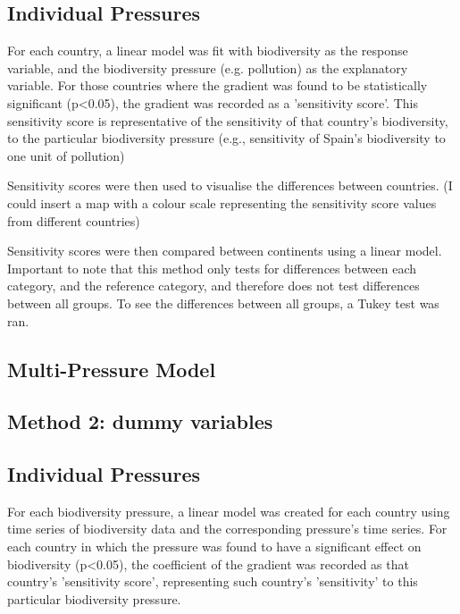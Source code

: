 \documentclass[11pt, a4paper, titlepage]{article}
\begin{document}
	\subsection*{Individual Pressures}
	
	For each country, a linear model was fit with biodiversity as the response variable, and the biodiversity pressure (e.g. pollution) as the explanatory variable. For those countries where the gradient was found to be statistically significant (p<0.05), the gradient was recorded as a 'sensitivity score'. This sensitivity score is representative of the sensitivity of that country's biodiversity, to the particular biodiversity pressure (e.g., sensitivity of Spain's biodiversity to one unit of pollution) \newline
	
	Sensitivity scores were then used to visualise the differences between countries. (I could insert a map with a colour scale representing the sensitivity score values from different countries) \newline
	
	Sensitivity scores were then compared between continents using a linear model. Important to note that this method only tests for differences between each category, and the reference category, and therefore does not test differences between all groups. To see the differences between all groups, a Tukey test was ran.  \newline
	
	
	\subsection*{Multi-Pressure Model}
	
	\subsection*{Method 2: dummy variables}
	
	\subsection*{Individual Pressures}
	
	For each biodiversity pressure, a linear model was created for each country using time series of biodiversity data and the corresponding pressure's time series. For each country in which the pressure was found to have a significant effect on biodiversity (p<0.05), the coefficient of the gradient was recorded as that country's 'sensitivity score', representing such country's 'sensitivity' to this particular biodiversity pressure. \newline
\end{document}
